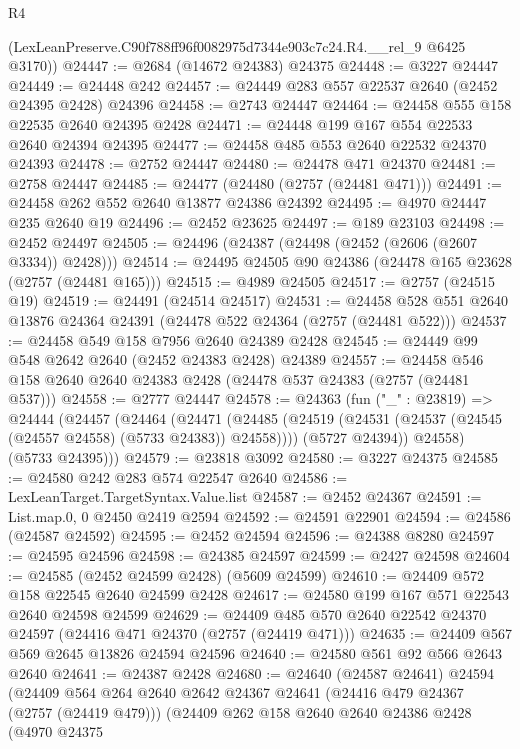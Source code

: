 \begin{lexlean}{R4}
\begin{coremodule}
      (LexLeanPreserve.C90f788ff96f0082975d7344e903c7c24.R4.__rel_9 @6425 @3170))
@24447 := @2684 (@14672 @24383) @24375
@24448 := @3227 @24447
@24449 := @24448 @242
@24457 := @24449 @283 @557 @22537 @2640 (@2452 @24395 @2428) @24396
@24458 := @2743 @24447
@24464 := @24458 @555 @158 @22535 @2640 @24395 @2428
@24471 := @24448 @199 @167 @554 @22533 @2640 @24394 @24395
@24477 := @24458 @485 @553 @2640 @22532 @24370 @24393
@24478 := @2752 @24447
@24480 := @24478 @471 @24370
@24481 := @2758 @24447
@24485 := @24477 (@24480 (@2757 (@24481 @471)))
@24491 := @24458 @262 @552 @2640 @13877 @24386 @24392
@24495 := @4970 @24447 @235 @2640 @19
@24496 := @2452 @23625
@24497 := @189 @23103
@24498 := @2452 @24497
@24505 := @24496 (@24387 (@24498 (@2452 (@2606 (@2607 @3334)) @2428)))
@24514 := @24495 @24505 @90 @24386 (@24478 @165 @23628 (@2757 (@24481 @165)))
@24515 := @4989 @24505
@24517 := @2757 (@24515 @19)
@24519 := @24491 (@24514 @24517)
@24531 := @24458 @528 @551 @2640 @13876 @24364 @24391 (@24478 @522 @24364 (@2757 (@24481 @522)))
@24537 := @24458 @549 @158 @7956 @2640 @24389 @2428
@24545 := @24449 @99 @548 @2642 @2640 (@2452 @24383 @2428) @24389
@24557 := @24458 @546 @158 @2640 @2640 @24383 @2428 (@24478 @537 @24383 (@2757 (@24481 @537)))
@24558 := @2777 @24447
@24578 := @24363
    (fun ("_" : @23819) =>
    @24444
      (@24457
        (@24464
          (@24471
            (@24485 (@24519 (@24531 (@24537 (@24545 (@24557 @24558) (@5733 @24383)) @24558))))
            (@5727 @24394))
          @24558)
        (@5733 @24395)))
@24579 := @23818 @3092
@24580 := @3227 @24375
@24585 := @24580 @242 @283 @574 @22547 @2640
@24586 := LexLeanTarget.TargetSyntax.Value.list
@24587 := @2452 @24367
@24591 := List.map.{0, 0} @2450 @2419 @2594
@24592 := @24591 @22901
@24594 := @24586 (@24587 @24592)
@24595 := @2452 @24594
@24596 := @24388 @8280
@24597 := @24595 @24596
@24598 := @24385 @24597
@24599 := @2427 @24598
@24604 := @24585 (@2452 @24599 @2428) (@5609 @24599)
@24610 := @24409 @572 @158 @22545 @2640 @24599 @2428
@24617 := @24580 @199 @167 @571 @22543 @2640 @24598 @24599
@24629 := @24409 @485 @570 @2640 @22542 @24370 @24597 (@24416 @471 @24370 (@2757 (@24419 @471)))
@24635 := @24409 @567 @569 @2645 @13826 @24594 @24596
@24640 := @24580 @561 @92 @566 @2643 @2640
@24641 := @24387 @2428
@24680 := @24640
    (@24587 @24641)
    @24594
    (@24409
      @564
      @264
      @2640
      @2642
      @24367
      @24641
      (@24416 @479 @24367 (@2757 (@24419 @479)))
      (@24409
        @262
        @158
        @2640
        @2640
        @24386
        @2428
        (@4970
          @24375

\end{coremodule}
\end{lexlean}
